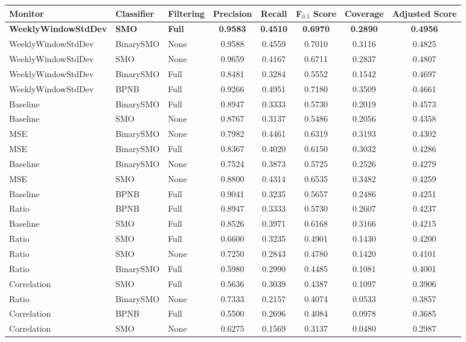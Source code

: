 {
   \setlength{\LTleft}{-20cm plus -1fill}
   \setlength{\LTright}{\LTleft}
   \small
   \begin{longtable}{|l|l|l|c|c|c|c|c|}
      \hline
         Monitor & Classifier & Filtering & Precision & Recall & F$_{0.5}$ Score & Coverage & Adjusted Score
      \tabularnewline\hline
         \textbf{WeeklyWindowStdDev} & \textbf{SMO} & \textbf{Full} & \textbf{0.9583} & \textbf{0.4510} & \textbf{0.6970} & \textbf{0.2890} & \textbf{0.4956}
      \tabularnewline\hline
         WeeklyWindowStdDev & BinarySMO & None & 0.9588 & 0.4559 & 0.7010 & 0.3116 & 0.4825
      \tabularnewline\hline
         WeeklyWindowStdDev & SMO & None & 0.9659 & 0.4167 & 0.6711 & 0.2837 & 0.4807
      \tabularnewline\hline
         WeeklyWindowStdDev & BinarySMO & Full & 0.8481 & 0.3284 & 0.5552 & 0.1542 & 0.4697
      \tabularnewline\hline
         WeeklyWindowStdDev & BPNB & Full & 0.9266 & 0.4951 & 0.7180 & 0.3509 & 0.4661
      \tabularnewline\hline
         Baseline & BinarySMO & Full & 0.8947 & 0.3333 & 0.5730 & 0.2019 & 0.4573
      \tabularnewline\hline
         Baseline & SMO & None & 0.8767 & 0.3137 & 0.5486 & 0.2056 & 0.4358
      \tabularnewline\hline
         MSE & BinarySMO & None & 0.7982 & 0.4461 & 0.6319 & 0.3193 & 0.4302
      \tabularnewline\hline
         MSE & BinarySMO & Full & 0.8367 & 0.4020 & 0.6150 & 0.3032 & 0.4286
      \tabularnewline\hline
         Baseline & BinarySMO & None & 0.7524 & 0.3873 & 0.5725 & 0.2526 & 0.4279
      \tabularnewline\hline
         MSE & SMO & None & 0.8800 & 0.4314 & 0.6535 & 0.3482 & 0.4259
      \tabularnewline\hline
         Baseline & BPNB & Full & 0.9041 & 0.3235 & 0.5657 & 0.2486 & 0.4251
      \tabularnewline\hline
         Ratio & BPNB & Full & 0.8947 & 0.3333 & 0.5730 & 0.2607 & 0.4237
      \tabularnewline\hline
         Baseline & SMO & Full & 0.8526 & 0.3971 & 0.6168 & 0.3166 & 0.4215
      \tabularnewline\hline
         Ratio & SMO & Full & 0.6600 & 0.3235 & 0.4901 & 0.1430 & 0.4200
      \tabularnewline\hline
         Ratio & SMO & None & 0.7250 & 0.2843 & 0.4780 & 0.1420 & 0.4101
      \tabularnewline\hline
         Ratio & BinarySMO & Full & 0.5980 & 0.2990 & 0.4485 & 0.1081 & 0.4001
      \tabularnewline\hline
         Correlation & SMO & Full & 0.5636 & 0.3039 & 0.4387 & 0.1097 & 0.3906
      \tabularnewline\hline
         Ratio & BinarySMO & None & 0.7333 & 0.2157 & 0.4074 & 0.0533 & 0.3857
      \tabularnewline\hline
         Correlation & BPNB & Full & 0.5500 & 0.2696 & 0.4084 & 0.0978 & 0.3685
      \tabularnewline\hline
         Correlation & SMO & None & 0.6275 & 0.1569 & 0.3137 & 0.0480 & 0.2987

\end{longtable}}
